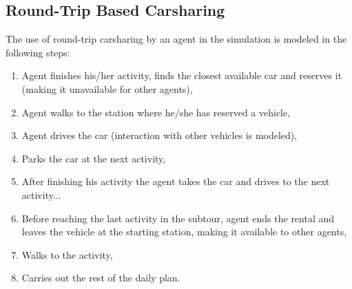 \subsection{Round-Trip Based Carsharing}
The use of round-trip carsharing by an agent in the simulation is modeled in the following steps: 
\begin{enumerate}
	\item Agent finishes his/her activity, finds the closest available car and reserves it (making it unavailable for other agents),
	\item Agent walks to the station where he/she has reserved a vehicle,
	\item Agent drives the car (interaction with other vehicles is modeled),
	\item Parks the car at the next activity,
	\item After finishing his activity the agent takes the car and drives to the next activity...
	\item Before reaching the last activity in the subtour, agent ends the rental and leaves the vehicle at the starting station, making it available to other agents,
	\item Walks to the activity,
	\item Carries out the rest of the daily plan.
\end{enumerate}

